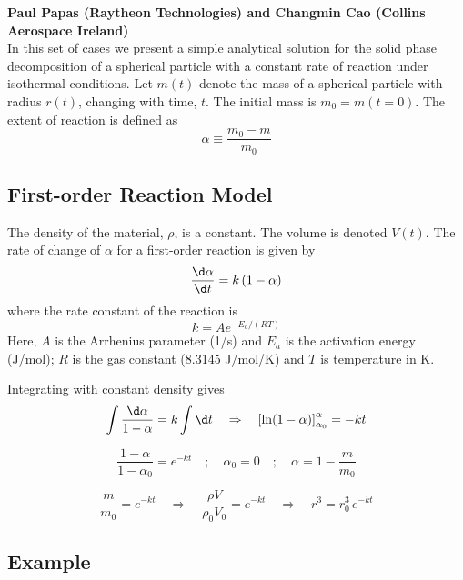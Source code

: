 \documentclass[11pt]{book}
\begin{document}
\textbf{Paul Papas (Raytheon Technologies) and Changmin Cao (Collins Aerospace Ireland)}\\

In this set of cases we present a simple analytical solution for the solid phase decomposition of a spherical particle with a constant rate of reaction under isothermal conditions.  Let $m(t)$ denote the mass of a spherical particle with radius $r(t)$, changing with time, $t$.  The initial mass is $m_0 = m(t=0)$.  The extent of reaction is defined as
\begin{equation}
\alpha \equiv \frac{m_0-m}{m_0}
\end{equation}

\subsection*{First-order Reaction Model}

The density of the material, $\rho$, is a constant.  The volume is denoted $V(t)$.  The rate of change of $\alpha$ for a first-order reaction is given by \cite{Khawam:2006}
\begin{equation}
\frac{\d \alpha}{\d t} = k \, (1-\alpha)
\end{equation}
where the rate constant of the reaction is
\begin{equation}
k = A e^{-E_a/(RT)}
\end{equation}
Here, $A$ is the Arrhenius parameter (1/s) and $E_a$ is the activation energy (J/mol); $R$ is the gas constant (8.3145 J/mol/K) and $T$ is temperature in K.

Integrating with constant density gives
\begin{equation}
\int \frac{\d \alpha}{1-\alpha} = k \int \d t \quad \Rightarrow \quad \left[\ln(1-\alpha)\right]_{\alpha_0}^{\alpha} = -k t
\end{equation}

\begin{equation}
\frac{1-\alpha}{1-\alpha_0} = e^{-kt} \quad ; \quad \alpha_0=0 \quad ; \quad \alpha = 1-\frac{m}{m_0}
\end{equation}

\begin{equation}
\frac{m}{m_0} = e^{-k t} \quad \Rightarrow \quad \frac{\rho V}{\rho_0 V_0} = e^{-k t} \quad \Rightarrow \quad r^3 = r_0^3 \, e^{-k t}
\end{equation}

\subsection*{Example}
\end{document}
